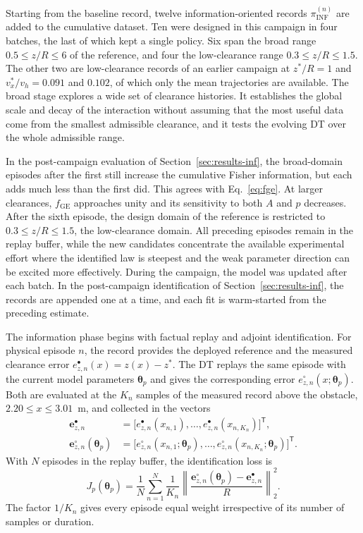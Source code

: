 \documentclass[journal]{IEEEtran}
\begin{document}
Starting from the baseline record, twelve information-oriented records $\pi_{\mathrm{INF}}^{(n)}$ are added to the cumulative dataset. Ten were designed in this campaign in four batches, the last of which kept a single policy. Six span the broad range $0.5\leq z/R\leq6$ of the reference, and four the low-clearance range $0.3\leq z/R\leq1.5$. The other two are low-clearance records of an earlier campaign at $z^\ast/R=1$ and $v_x^\ast/v_h=0.091$ and $0.102$, of which only the mean trajectories are available. The broad stage explores a wide set of clearance histories. It establishes the global scale and decay of the interaction without assuming that the most useful data come from the smallest admissible clearance, and it tests the evolving DT over the whole admissible range.

In the post-campaign evaluation of Section~\ref{sec:results-inf}, the broad-domain episodes after the first still increase the cumulative Fisher information, but each adds much less than the first did. This agrees with Eq.~\eqref{eq:fge}. At larger clearances, $f_{\mathrm{GE}}$ approaches unity and its sensitivity to both $A$ and $p$ decreases. After the sixth episode, the design domain of the reference is restricted to $0.3\leq z/R\leq1.5$, the low-clearance domain. All preceding episodes remain in the replay buffer, while the new candidates concentrate the available experimental effort where the identified law is steepest and the weak parameter direction can be excited more effectively. During the campaign, the model was updated after each batch. In the post-campaign identification of Section~\ref{sec:results-inf}, the records are appended one at a time, and each fit is warm-started from the preceding estimate.

The information phase begins with factual replay and adjoint identification. For physical episode $n$, the record provides the deployed reference and the measured clearance error $e_{z,n}^{\bullet}(x)=z(x)-z^\ast$. The DT replays the same episode with the current model parameters $\boldsymbol{\theta}_p$ and gives the corresponding error $e_{z,n}^{\circ}(x;\boldsymbol{\theta}_p)$. Both are evaluated at the $K_n$ samples of the measured record above the obstacle, $2.20\leq x\leq3.01$~m, and collected in the vectors
\begin{align}
 \mathbf e_{z,n}^{\bullet}
 &=\bigl[e_{z,n}^{\bullet}(x_{n,1}),\ldots,
 e_{z,n}^{\bullet}(x_{n,K_n})\bigr]^{\mathsf T},\\
 \mathbf e_{z,n}^{\circ}(\boldsymbol{\theta}_p)
 &=\bigl[e_{z,n}^{\circ}(x_{n,1};\boldsymbol{\theta}_p),\ldots,
 e_{z,n}^{\circ}(x_{n,K_n};\boldsymbol{\theta}_p)\bigr]^{\mathsf T}.
 \label{eq:episode-error-vectors}
\end{align}
With $N$ episodes in the replay buffer, the identification loss is
\begin{equation}
 J_p(\boldsymbol{\theta}_p)=
 \frac{1}{N}\sum_{n=1}^{N}
 \frac{1}{K_n}
 \left\|
 \frac{\mathbf e_{z,n}^{\circ}(\boldsymbol{\theta}_p)
       -\mathbf e_{z,n}^{\bullet}}{R}
 \right\|_2^2.
 \label{eq:identification-loss}
\end{equation}
The factor $1/K_n$ gives every episode equal weight irrespective of its number of samples or duration.
\end{document}
